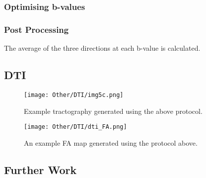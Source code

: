 \subsubsection{Optimising b-values}

\subsubsection{Post Processing}

The average of the three directions at each b-value is calculated.


\subsection{\acl*{DTI}}
\begin{figure}[H]
	\centering
	\texttt{[image: Other/DTI/img5c.png]}
	\caption{Example tractography generated using the above protocol.}
	\label{fig:ex_dti_tracts}
\end{figure}

\begin{figure}[H]
	\centering
	\texttt{[image: Other/DTI/dti\_FA.png]}
	\caption{An example \ac{FA} map generated using the protocol above.}
	\label{fig:ex_dti_fa}
\end{figure}

\subsection{Further Work}

